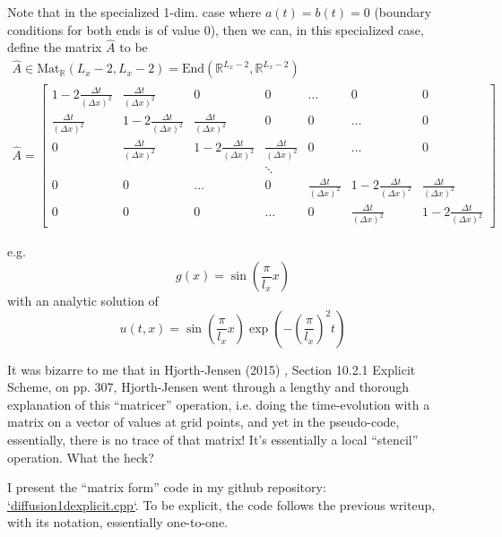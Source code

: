 \documentclass[10pt]{amsart}
\begin{document}
\begin{multicols*}{2}
Note that in the specialized 1-dim. case where $a(t) = b(t)=0$ (boundary conditions for both ends is of value $0$), then we can, in this specialized case, define the matrix $\widehat{A}$ to be
\begin{equation}
  \begin{gathered}
    \widehat{A} \in \text{Mat}_{\mathbb{R}}(L_x-2,L_x-2) = \text{End}(\mathbb{R}^{L_x-2}, \mathbb{R}^{L_x-2}) \\
    \widehat{A} = \left[ \begin{matrix}
        1 - 2  \frac{ \Delta t}{ (\Delta x)^2 } &  \frac{ \Delta t}{ (\Delta x)^2 } & 0 & 0 & \dots  &  0 & 0 \\
         \frac{ \Delta t}{ (\Delta x)^2 } & 1 -  2 \frac{ \Delta t}{ (\Delta x)^2 } &  \frac{ \Delta t}{ (\Delta x)^2 } & 0 & 0 & \dots & 0  \\ 
         0 &  \frac{ \Delta t}{ (\Delta x)^2 } & 1 - 2  \frac{ \Delta t}{ (\Delta x)^2 } &  \frac{ \Delta t}{ (\Delta x)^2 } & 0 & \dots & 0 \\
         &  &  & \ddots  &   &   & \\
         0   & 0  & \dots  & 0        &  \frac{ \Delta t}{ (\Delta x)^2 } & 1 - 2  \frac{ \Delta t}{ (\Delta x)^2 } &  \frac{ \Delta t}{ (\Delta x)^2 }  \\
         0 & 0 & 0 & \dots & 0 &  \frac{ \Delta t}{ (\Delta x)^2 } & 1 - 2  \frac{ \Delta t}{ (\Delta x)^2 } 
        \end{matrix} \right]
  \end{gathered}
\end{equation}  

e.g.
\[
g(x) = \sin{ \left( \frac{ \pi }{ l_x} x \right) }
\]
with an analytic solution of
\[
u(t,x) = \sin{ \left( \frac{\pi}{l_x}x \right) } \exp{ \left( - \left( \frac{\pi}{l_x}\right)^2 t \right) }
\]

It was bizarre to me that in Hjorth-Jensen (2015) \cite{Hjor2015}, Section 10.2.1 Explicit Scheme, on pp. 307, Hjorth-Jensen went through a lengthy and thorough explanation of this ``matricer'' operation, i.e. doing the time-evolution with a matrix on a vector of values at grid points, and yet in the pseudo-code, essentially, there is no trace of that matrix!  It's essentially a local ``stencil'' operation.  What the heck?

I present the ``matrix form'' code in my github repository: \href{https://github.com/ernestyalumni/CompPhys/blob/master/Cpp/progs/ch10pde/diffusion1dexplicit.cpp}{`diffusion1dexplicit.cpp`}.  To be explicit, the code follows the previous writeup, with its notation, essentially one-to-one.  


\end{multicols*}
\end{document}
